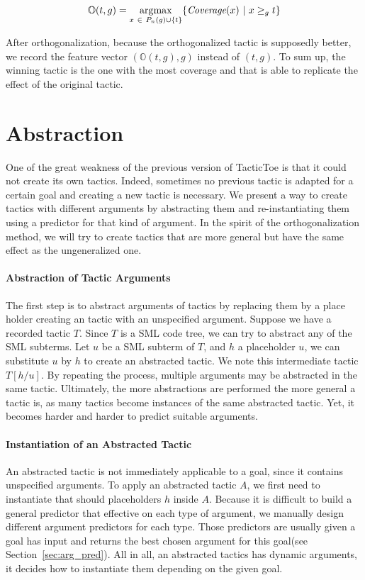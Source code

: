 \documentclass[runningheads,a4paper,draft]{svjour3}
\DeclareMathOperator*{\argmax}{\arg\!\max}
\def\sml{\textsf{SML}\xspace}
\def\tactictoe{\textsf{TacticToe}\xspace}
\begin{document}
\[\mathbb{O}(t,g) = \argmax_{x\ \in\ P_n(g) \cup \lbrace t \rbrace} \lbrace 
\textit{\mbox{Coverage}}(x)\ 
|\ x \ge_g t\rbrace\] 
                   
After orthogonalization, because the orthogonalized tactic is supposedly 
better, we record the feature vector $(\mathbb{O}(t,g),g)$ instead of 
$(t,g)$. To sum up, the winning tactic is the one with the most coverage and 
that is able to replicate the effect of the original tactic.



\section{Abstraction}\label{sec:synthesis}
One of the great weakness of the previous version of \tactictoe is that
it could not create its own tactics. Indeed, sometimes no previous tactic is 
adapted for a certain goal and creating a new tactic is necessary.
We present a way to create tactics with different arguments
by abstracting them and re-instantiating them using a predictor for that kind 
of argument. In the spirit of the orthogonalization method, we will try to 
create tactics that are more general but have the same effect as the 
ungeneralized one.



\paragraph{Abstraction of Tactic Arguments}
The first step is to abstract arguments of tactics by replacing them by a 
place holder creating an tactic with an unspecified argument.
Suppose we have a recorded tactic $T$. Since $T$ is a \sml code tree, we can 
try to abstract any of the 
\sml subterms. Let $u$ be a \sml subterm of $T$, and $h$ a placeholder $u$, we 
can substitute $u$ by $h$ to create an abstracted tactic.
We note this intermediate tactic $T[h/u]$. By repeating the process, multiple 
arguments may be abstracted in the same tactic. Ultimately, the more 
abstractions are performed the more general a tactic is, as many tactics 
become instances of the same abstracted tactic. Yet, it becomes harder and 
harder to predict suitable arguments. 

\paragraph{Instantiation of an Abstracted Tactic}
An abstracted tactic is not immediately applicable to a goal, since it contains
unspecified arguments. To apply an abstracted tactic $A$, we first need to 
instantiate that should placeholders $h$ inside $A$. Because it is difficult to 
build a general predictor that effective on each type of argument, we manually 
design different argument predictors for each type. Those predictors are 
usually given a goal has input and returns the best chosen argument for this 
goal(see Section~\ref{sec:arg_pred}). All in all, an abstracted tactics has 
dynamic arguments, it decides how to instantiate them depending on the given 
goal. 
\end{document}
